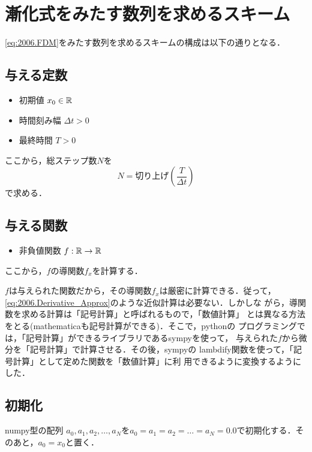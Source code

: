  \section{漸化式をみたす数列を求めるスキーム}

 \eqref{eq:2006.FDM}をみたす数列を求めるスキームの構成は以下の通りとなる．

  \subsection*{与える定数}
  \begin{itemize}
   \item 初期値 $x_0\in\mathbb{R}$
   \item 時間刻み幅 $\Delta t > 0$
   \item 最終時間 $T > 0$
  \end{itemize}
  ここから，総ステップ数$N$を
  \begin{equation}
   N = \text{切り上げ}\left(\frac{T}{\Delta t}\right)
  \end{equation}
  で求める．

  \subsection*{与える関数}
  \begin{itemize}
   \item 非負値関数 $f:\mathbb{R}\rightarrow\mathbb{R}$
  \end{itemize}
  ここから，$f$の導関数$f_x$を計算する．

  \begin{remark}
   $f$は与えられた関数だから，その導関数$f_x$は厳密に計算できる．従って，
   \eqref{eq:2006.Derivative_Approx}のような近似計算は必要ない．しかしな
   がら，導関数を求める計算は「記号計算」と呼ばれるもので，「数値計算」
   とは異なる方法をとる(mathematicaも記号計算ができる)．そこで，pythonの
   プログラミングでは，「記号計算」ができるライブラリであるsympyを使って，
   与えられた$f$から微分を「記号計算」で計算させる．その後，sympyの
   lambdify関数を使って，「記号計算」として定めた関数を「数値計算」に利
   用できるように変換するようにした．
  \end{remark}

  \subsection*{初期化}
  numpy型の配列 $a_0, a_1, a_2, \dots, a_N$を$a_0=a_1=a_2=\ldots
  =a_N=0.0$で初期化する．そのあと，$a_0 = x_0$と置く．

